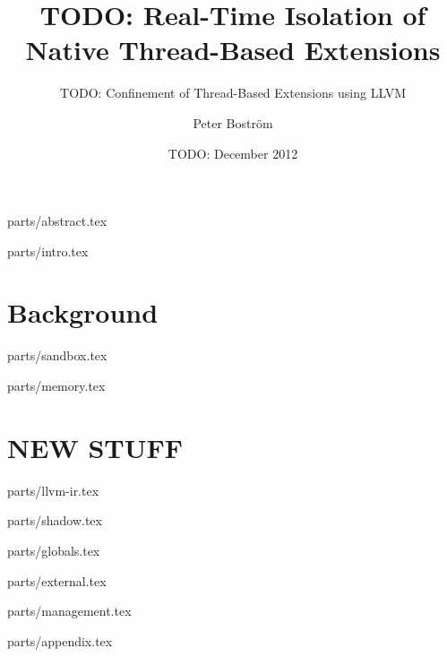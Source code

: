 \documentclass[a4paper,11pt]{xjobb/kth-mag}
\title {TODO: Real-Time Isolation of Native Thread-Based Extensions}
\subtitle {TODO: Confinement of Thread-Based Extensions using LLVM}
\author {Peter Boström}
\date {TODO: December 2012}
\begin{document}
\frontmatter
\pagestyle {empty}
\removepagenumbers
\maketitle
{}

 {parts/abstract.tex}

\clearpage
\tableofcontents*
\mainmatter
\pagestyle {newchap}

 {parts/intro.tex}

\part {Background}

 {parts/sandbox.tex}

 {parts/memory.tex}

\part {NEW STUFF}

 {parts/llvm-ir.tex}

 {parts/shadow.tex}

 {parts/globals.tex}

 {parts/external.tex}

 {parts/management.tex}

\appendix
\addappheadtotoc

 {parts/appendix.tex}
\end{document}
